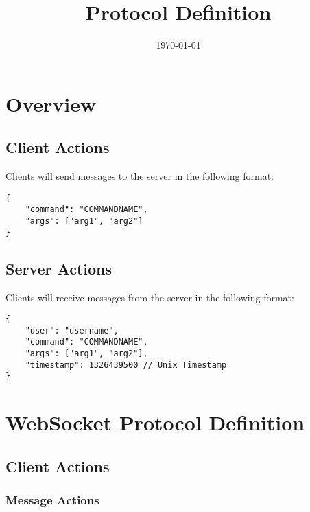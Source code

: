 \documentclass[11pt]{article}
\date{\today}
\title{Protocol Definition}
\begin{document}
\maketitle
\tableofcontents


\section{Overview}
\label{sec-1}

\subsection{Client Actions}
\label{sec-1-1}

Clients will send messages to the server in the following format:

\lstset{language=js,label= ,caption= ,numbers=none}
\begin{lstlisting}
{
    "command": "COMMANDNAME",
    "args": ["arg1", "arg2"]
}
\end{lstlisting}

\subsection{Server Actions}
\label{sec-1-2}

Clients will receive messages from the server in the following
format:

\lstset{language=js,label= ,caption= ,numbers=none}
\begin{lstlisting}
{
    "user": "username",
    "command": "COMMANDNAME",
    "args": ["arg1", "arg2"],
    "timestamp": 1326439500 // Unix Timestamp
}
\end{lstlisting}


\section{WebSocket Protocol Definition}
\label{sec-2}

\subsection{Client Actions}
\label{sec-2-1}

\subsubsection{Message Actions}
\label{sec-2-1-1}
\end{document}
